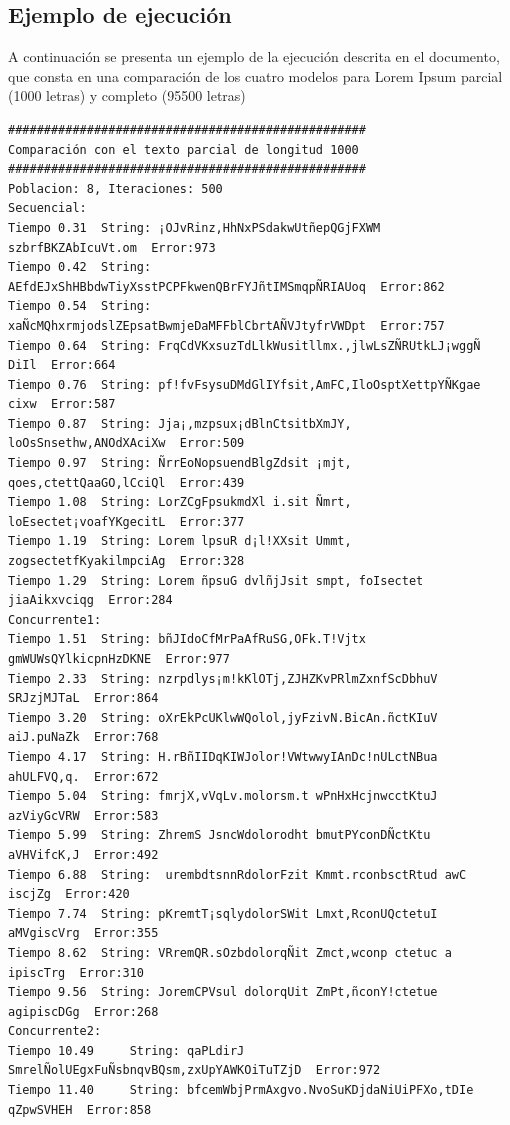 \documentclass[a4paper,twocolumn,10pt]{article}
\begin{document}
\subsection{Ejemplo de ejecución}
A continuación se presenta un ejemplo de la ejecución descrita en el documento, que consta en una comparación de los cuatro modelos para Lorem Ipsum parcial (1000 letras) y completo (95500 letras)
\begin{center}
    

{\scriptsize

\begin{verbatim}
##################################################
Comparación con el texto parcial de longitud 1000
##################################################
Poblacion: 8, Iteraciones: 500
Secuencial:
Tiempo 0.31	 String: ¡OJvRinz,HhNxPSdakwUtñepQGjFXWM szbrfBKZAbIcuVt.om	 Error:973
Tiempo 0.42	 String: AEfdEJxShHBbdwTiyXsstPCPFkwenQBrFYJñtIMSmqpÑRIAUoq	 Error:862
Tiempo 0.54	 String: xaÑcMQhxrmjodslZEpsatBwmjeDaMFFblCbrtAÑVJtyfrVWDpt	 Error:757
Tiempo 0.64	 String: FrqCdVKxsuzTdLlkWusitllmx.,jlwLsZÑRUtkLJ¡wggÑ DiIl	 Error:664
Tiempo 0.76	 String: pf!fvFsysuDMdGlIYfsit,AmFC,IloOsptXettpYÑKgae cixw	 Error:587
Tiempo 0.87	 String: Jja¡,mzpsux¡dBlnCtsitbXmJY, loOsSnsethw,ANOdXAciXw	 Error:509
Tiempo 0.97	 String: ÑrrEoNopsuendBlgZdsit ¡mjt, qoes,ctettQaaGO,lCciQl	 Error:439
Tiempo 1.08	 String: LorZCgFpsukmdXl i.sit Ñmrt, loEsectet¡voafYKgecitL	 Error:377
Tiempo 1.19	 String: Lorem lpsuR d¡l!XXsit Ummt, zogsectetfKyakilmpciAg	 Error:328
Tiempo 1.29	 String: Lorem ñpsuG dvlñjJsit smpt, foIsectet jiaAikxvciqg	 Error:284
Concurrente1:
Tiempo 1.51	 String: bñJIdoCfMrPaAfRuSG,OFk.T!Vjtx gmWUWsQYlkicpnHzDKNE	 Error:977
Tiempo 2.33	 String: nzrpdlys¡m!kKlOTj,ZJHZKvPRlmZxnfScDbhuV SRJzjMJTaL	 Error:864
Tiempo 3.20	 String: oXrEkPcUKlwWQolol,jyFzivN.BicAn.ñctKIuV aiJ.puNaZk	 Error:768
Tiempo 4.17	 String: H.rBñIIDqKIWJolor!VWtwwyIAnDc!nULctNBua ahULFVQ,q.	 Error:672
Tiempo 5.04	 String: fmrjX,vVqLv.molorsm.t wPnHxHcjnwcctKtuJ azViyGcVRW	 Error:583
Tiempo 5.99	 String: ZhremS JsncWdolorodht bmutPYconDÑctKtu  aVHVifcK,J	 Error:492
Tiempo 6.88	 String:  urembdtsnnRdolorFzit Kmmt.rconbsctRtud awC iscjZg	 Error:420
Tiempo 7.74	 String: pKremtT¡sqlydolorSWit Lmxt,RconUQctetuI aMVgiscVrg	 Error:355
Tiempo 8.62	 String: VRremQR.sOzbdolorqÑit Zmct,wconp ctetuc a ipiscTrg	 Error:310
Tiempo 9.56	 String: JoremCPVsul dolorqUit ZmPt,ñconY!ctetue agipiscDGg	 Error:268
Concurrente2:
Tiempo 10.49	 String: qaPLdirJ SmrelÑolUEgxFuÑsbnqvBQsm,zxUpYAWKOiTuTZjD	 Error:972
Tiempo 11.40	 String: bfcemWbjPrmAxgvo.NvoSuKDjdaNiUiPFXo,tDIe qZpwSVHEH	 Error:858

\end{verbatim}}
\end{center}
\end{document}
